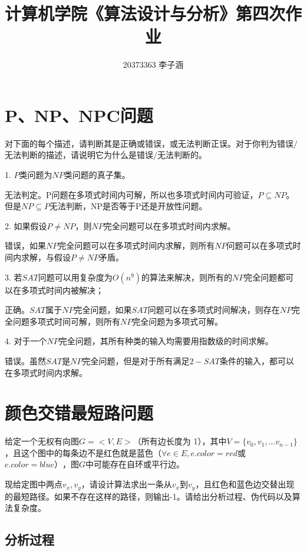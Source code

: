 \documentclass{article}
\title{ 计算机学院《算法设计与分析》第四次作业}
\author{20373363 李子涵}
\begin{document}
\maketitle

\section{P、NP、NPC问题} %

对下面的每个描述，请判断其是正确或错误，或无法判断正误。对于你判为错误$/$无法判断的描述，请说明它为什么是错误$/$无法判断的。

1. $P $类问题为$ NP $类问题的真子集。

无法判定。P问题在多项式时间内可解，所以也多项式时间内可验证，$P\subseteq NP$。但是$NP \subseteq P$无法判断，NP是否等于P还是开放性问题。

2. 如果假设$ P \neq NP$，则$ NP $完全问题可以在多项式时间内求解。

错误，如果$ NP $完全问题可以在多项式时间内求解，则所有$ NP $问题可以在多项式时间内求解，与假设$ P \neq NP $矛盾。

3. 若$ SAT $问题可以用复杂度为$ O(n^9) $的算法来解决，则所有的$ NP $完全问题都可以在多项式时间内被解决；

正确。$SAT$属于$NP$完全问题，如果$SAT$问题可以在多项式时间解决，则存在$NP$完全问题多项式时间可解，则所有$NP$完全问题为多项式可解。

4. 对于一个$ NP $完全问题，其所有种类的输入均需要用指数级的时间求解。

错误。虽然$SAT$是$NP$完全问题，但是对于所有满足$2-SAT$条件的输入，都可以在多项式时间内求解。

\section{颜色交错最短路问题} %

给定一个无权有向图$ G =< V, E >$（所有边长度为 1），其中$ V = \{v_0, v_1,...v_{n−1}\}$，且这个图中的每条边不是红色就是蓝色$（\forall e \in E, e.color = red $或$ e.color = blue）$，图$ G $中可能存在自环或平行边。

现给定图中两点$ v_x, v_y$，请设计算法求出一条从$ v_x $到$ v_y$，且红色和蓝色边交替出现的最短路径。如果不存在这样的路径，则输出-1。请给出分析过程、伪代码以及算法复杂度。

\subsection{分析过程} %
\end{document}
